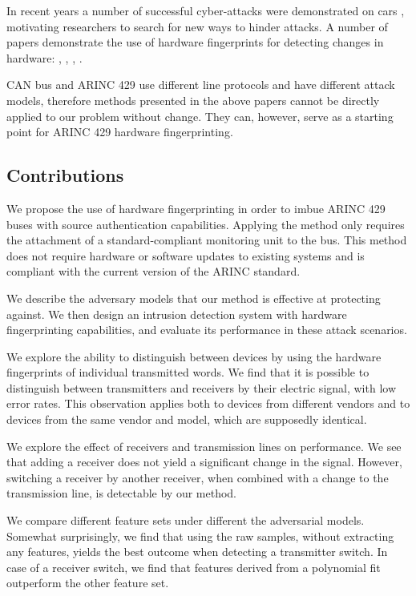 \documentclass[english]{llncs}
\newcommand{\sublevel}[1]{\subsection{#1}}
\newcommand{\sublevel}[1]{\section{#1}}
\begin{document}
  In recent years a number of successful cyber-attacks were demonstrated on cars \cite{miller2015remote}, motivating researchers to search for new ways to hinder attacks. A number of papers demonstrate the use of hardware fingerprints for detecting changes in hardware: \cite{murvay2014source}, \cite{cho2017viden}, \cite{choi2018voltageids}, \cite{kneib2018scission}.
  
  CAN bus and ARINC 429 use different line protocols and have different attack models, therefore methods presented in the above papers cannot be directly applied to our problem without change. They can, however, serve as a starting point for ARINC 429 hardware fingerprinting.

\vspace*{-1ex} 
\sublevel{Contributions}
  We propose the use of hardware fingerprinting in order to imbue ARINC 429 buses with source authentication capabilities. Applying the method only requires the attachment of a standard-compliant monitoring unit to the bus. This method does not require hardware or software updates to existing systems and is compliant with the current version of the ARINC standard.
  
  We describe the adversary models that our method is effective at protecting against. We then design an intrusion detection system with hardware fingerprinting capabilities, and evaluate its performance in these attack scenarios.
  
  We explore the ability to distinguish between devices
  by using the hardware fingerprints of individual transmitted words. We find that it is possible to distinguish between transmitters and receivers by their electric signal, with low error rates. This observation applies both to devices from different vendors and to devices from the same vendor and model, which are supposedly identical.
  
  We explore the effect of receivers and transmission lines on performance. We see that adding a receiver does not yield a significant change in the signal. However, switching a receiver by another receiver, when combined with a change to the transmission line, is detectable by our method.
  
  We compare different feature sets under different the adversarial models. Somewhat surprisingly, we find that using the raw samples, without extracting any features, yields the best outcome when detecting a transmitter switch. In case of a receiver switch, we find that features derived from a polynomial fit outperform the other feature set.
  
\end{document}
